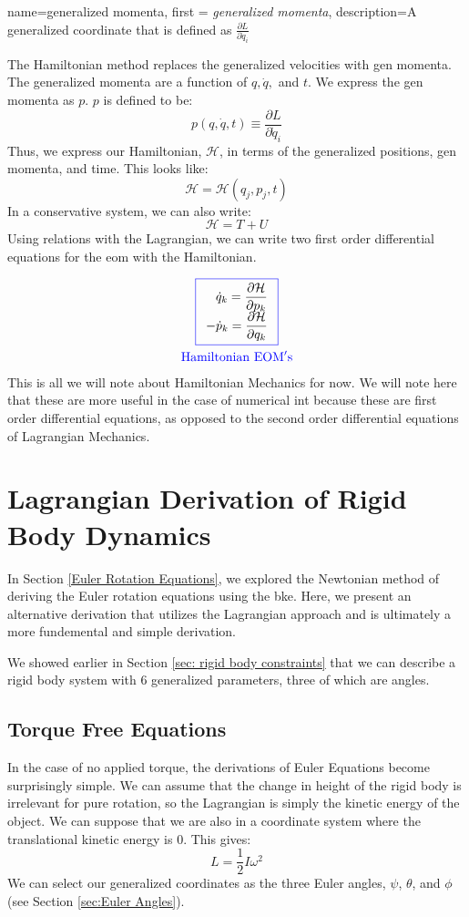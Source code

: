 \documentclass[12pt]{report}
\begin{document}
{
    name=generalized momenta,
    first = {\textit{generalized momenta}},
    description={A generalized coordinate that is defined as $\frac{\partial L}{\partial \dot{q}_i}$}
}

The Hamiltonian method replaces the generalized velocities with \gls{gen momenta}. The generalized momenta are a function of $q,\dot{q},$ and $t$. We express the \gls{gen momenta} as $p$. $p$ is defined to be:
$$p(q,\dot{q},t)\equiv\dfrac{\partial L}{\partial \dot{q}_i}$$
Thus, we express our Hamiltonian, $\mathcal{H}$, in terms of the generalized positions, \gls{gen momenta}, and time. This looks like:
$$\mathcal{H}=\mathcal{H}(q_j,p_j,t)$$
In a \gls{conservative} system, we can also write: $$\mathcal{H}=T+U$$
Using relations with the \gls{Lagrangian}, we can write two first order differential equations for the \gls{eom} with the Hamiltonian.

\begin{gather}
\color{blue}\boxed{
\begin{array}{r}\color{black}
     \dot{q}_k=\dfrac{\partial \mathcal{H}}{\partial p_k}\\
     \color{black}
  -\dot{p}_k=\dfrac{\partial \mathcal{H}}{\partial q_k}
\end{array}
}\\
\color{blue}\mathrm{Hamiltonian \ EOM's}
\end{gather}
This is all we will note about Hamiltonian Mechanics for now. We will note here that these are more useful in the case of \gls{numerical int} because these are first order differential equations, as opposed to the second order differential equations of \gls{Lagrangian} Mechanics.
\section{Lagrangian Derivation of Rigid Body Dynamics}

In Section \ref{Euler Rotation Equations}, we explored the Newtonian method of deriving the Euler rotation equations using the \gls{bke}. Here, we present an alternative derivation that utilizes the \gls{Lagrangian} approach and is ultimately a more fundemental and simple derivation.

We showed earlier in Section \ref{sec: rigid body constraints} that we can describe a \gls{rigid body} system with 6 generalized parameters, three of which are angles.
\subsection{Torque Free Equations}
In the case of no applied torque, the derivations of \glspl{Euler Equation} become surprisingly simple. We can assume that the change in height of the \gls{rigid body} is irrelevant for pure rotation, so the \gls{Lagrangian} is simply the kinetic energy of the object. We can suppose that we are also in a coordinate system where the translational kinetic energy is 0. This gives:
\begin{equation}\label{eq:rigid body KE}
L=\frac{1}{2}I\omega^2
\end{equation}
We can select our generalized coordinates as the three Euler angles, $\psi$, $\theta$, and $\phi$ (see Section \ref{sec:Euler Angles}).
\end{document}
